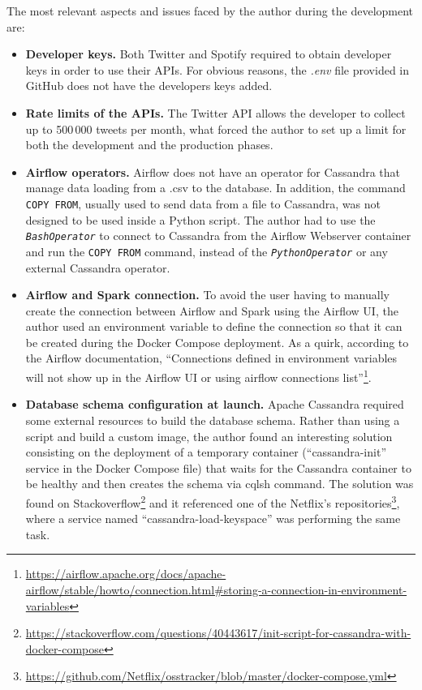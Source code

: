 



\nonzeroparskip The most relevant aspects and issues faced by the author during the development are:
\begin{itemize}
	\item \textbf{Developer keys.} Both Twitter and Spotify required to obtain developer keys in order to use their APIs. For obvious reasons, the \textit{.env} file provided in GitHub does not have the developers keys added.
	\item \textbf{Rate limits of the APIs.} The Twitter API allows the developer to collect up to 500\,000 tweets per month, what forced the author to set up a limit for both the development and the production phases.
	\item \textbf{Airflow operators.} Airflow does not have an operator for Cassandra that manage data loading from a .csv to the database. In addition, the command \texttt{COPY FROM}, usually used to send data from a file to Cassandra, was not designed to be used inside a Python script. The author had to use the \texttt{\textit{BashOperator}} to connect to Cassandra from the Airflow Webserver container and run the \texttt{COPY FROM} command, instead of the \texttt{\textit{PythonOperator}} or any external Cassandra operator.
	\item \textbf{Airflow and Spark connection.} To avoid the user having to manually create the connection between Airflow and Spark using the Airflow UI, the author used an environment variable to define the connection so that it can be created during the Docker Compose deployment. As a quirk, according to the Airflow documentation, ``Connections defined in environment variables will not show up in the Airflow UI or using airflow connections list''\footnote{\url{https://airflow.apache.org/docs/apache-airflow/stable/howto/connection.html\#storing-a-connection-in-environment-variables}}.
	\item \textbf{Database schema configuration at launch.} Apache Cassandra required some external resources to build the database schema. Rather than using a script and build a custom image, the author found an interesting solution consisting on the deployment of a temporary container (``cassandra-init'' service in the Docker Compose file) that waits for the Cassandra container to be healthy and then creates the schema via cqlsh command. The solution was found on Stackoverflow\footnote{\url{https://stackoverflow.com/questions/40443617/init-script-for-cassandra-with-docker-compose}} and it referenced one of the Netflix's repositories\footnote{\url{https://github.com/Netflix/osstracker/blob/master/docker-compose.yml}}, where a service named ``cassandra-load-keyspace'' was performing the same task.

\end{itemize}
